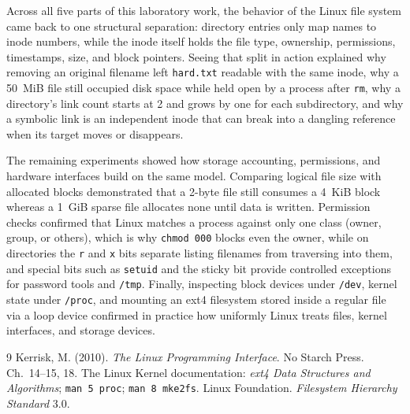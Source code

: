 \documentclass{assets/utmreport}
\begin{document}
\utmconclusions
Across all five parts of this laboratory work, the behavior of the Linux file system came back to one structural separation: directory entries only map names to inode numbers, while the inode itself holds the file type, ownership, permissions, timestamps, size, and block pointers. Seeing that split in action explained why removing an original filename left \texttt{hard.txt} readable with the same inode, why a 50~MiB file still occupied disk space while held open by a process after \texttt{rm}, why a directory's link count starts at 2 and grows by one for each subdirectory, and why a symbolic link is an independent inode that can break into a dangling reference when its target moves or disappears.

The remaining experiments showed how storage accounting, permissions, and hardware interfaces build on the same model. Comparing logical file size with allocated blocks demonstrated that a 2-byte file still consumes a 4~KiB block whereas a 1~GiB sparse file allocates none until data is written. Permission checks confirmed that Linux matches a process against only one class (owner, group, or others), which is why \texttt{chmod 000} blocks even the owner, while on directories the \texttt{r} and \texttt{x} bits separate listing filenames from traversing into them, and special bits such as \texttt{setuid} and the sticky bit provide controlled exceptions for password tools and \texttt{/tmp}. Finally, inspecting block devices under \texttt{/dev}, kernel state under \texttt{/proc}, and mounting an ext4 filesystem stored inside a regular file via a loop device confirmed in practice how uniformly Linux treats files, kernel interfaces, and storage devices.

\begin{thebibliography}{9}
 Kerrisk, M. (2010). \textit{The Linux Programming Interface}. No Starch Press. Ch.~14--15, 18.
 The Linux Kernel documentation: \textit{ext4 Data Structures and Algorithms}; \texttt{man 5 proc}; \texttt{man 8 mke2fs}.
 Linux Foundation. \textit{Filesystem Hierarchy Standard} 3.0.
\end{thebibliography}
\end{document}
